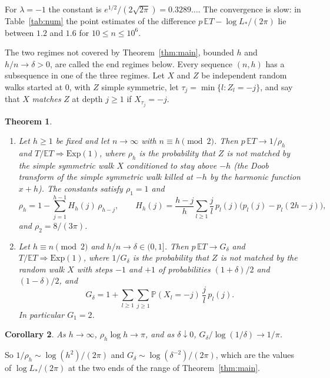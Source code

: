 \documentclass[11pt]{amsart}
\newtheorem{theorem}{Theorem}[section]
\newtheorem{corollary}[theorem]{Corollary}
\theoremstyle{remark}
\numberwithin{equation}{section}
\newcommand{\PP}{\mathbb{P}}
\newcommand{\EE}{\mathbb{E}}
\begin{document}
For $\lambda=-1$ the constant is $e^{1/2}/(2\sqrt{2\pi})=0.3289\dots$. The convergence is slow: in Table~\ref{tab:num} the point estimates of the difference $p\,\EE T-\log L_*/(2\pi)$ lie between $1.2$ and $1.6$ for $10\le n\le10^6$.

The two regimes not covered by Theorem~\ref{thm:main}, bounded $h$ and $h/n\to\delta>0$, are called the end regimes below. Every sequence $(n,h)$ has a subsequence in one of the three regimes. Let $X$ and $Z$ be independent random walks started at $0$, with $Z$ simple symmetric, let $\tau_j=\min\{l:Z_l=-j\}$, and say that $X$ \emph{matches} $Z$ at depth $j\ge1$ if $X_{\tau_j}=-j$.

\begin{theorem}\label{thm:ends}
\begin{enumerate}
\item[(a)] Let $h\ge1$ be fixed and let $n\to\infty$ with $n\equiv h\pmod2$. Then $p\,\EE T\to1/\rho_h$ and $T/\EE T\Rightarrow\mathrm{Exp}(1)$, where $\rho_h$ is the probability that $Z$ is not matched by the simple symmetric walk $X$ conditioned to stay above $-h$ (the Doob transform of the simple symmetric walk killed at $-h$ by the harmonic function $x+h$). The constants satisfy $\rho_1=1$ and
\begin{equation}\label{eq:rho}
\rho_h=1-\sum_{j=1}^{h-1}H_h(j)\,\rho_{h-j},\qquad H_h(j)=\frac{h-j}{h}\sum_{l\ge1}\frac jl\,p_l(j)\bigl(p_l(j)-p_l(2h-j)\bigr),
\end{equation}
and $\rho_2=8/(3\pi)$.
\item[(b)] Let $h\equiv n\pmod2$ and $h/n\to\delta\in(0,1]$. Then $p\,\EE T\to G_\delta$ and $T/\EE T\Rightarrow\mathrm{Exp}(1)$, where $1/G_\delta$ is the probability that $Z$ is not matched by the random walk $X$ with steps $-1$ and $+1$ of probabilities $(1+\delta)/2$ and $(1-\delta)/2$, and
\begin{equation}\label{eq:G}
G_\delta=1+\sum_{l\ge1}\sum_{j\ge1}\PP(X_l=-j)\,\frac jl\,p_l(j).
\end{equation}
In particular $G_1=2$.
\end{enumerate}
\end{theorem}

\begin{corollary}\label{cor:match}
As $h\to\infty$, $\rho_h\log h\to\pi$, and as $\delta\downarrow0$, $G_\delta/\log(1/\delta)\to1/\pi$.
\end{corollary}

So $1/\rho_h\sim\log(h^2)/(2\pi)$ and $G_\delta\sim\log(\delta^{-2})/(2\pi)$, which are the values of $\log L_*/(2\pi)$ at the two ends of the range of Theorem~\ref{thm:main}.
\end{document}
